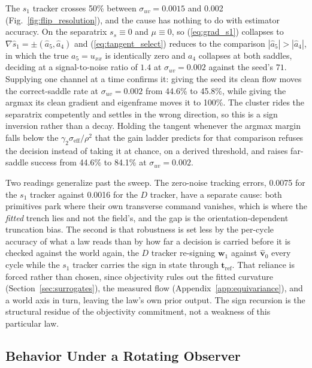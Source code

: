 \documentclass[lettersize,journal]{IEEEtran}
\begin{document}
The $s_1$ tracker crosses 50\% between $\sigma_{uv} = 0.0015$ and 0.002
(Fig.~\ref{fig:flip_resolution}), and the cause has nothing to do with
estimator accuracy. On the separatrix $s_s \equiv 0$ and $\mu \equiv 0$,
so (\ref{eq:grad_s1}) collapses to $\nabla\hat{s}_1 = \pm(\hat{a}_5,
\hat{a}_4)$ and (\ref{eq:tangent_select}) reduces to the comparison
$|\hat{a}_5| > |\hat{a}_4|$, in which the true $a_5 = u_{xx}$ is
identically zero and $a_4$ collapses at both saddles, deciding at a
signal-to-noise ratio of $1.4$ at $\sigma_{uv} = 0.002$ against the
seed's $71$. Supplying one channel at a time confirms it: giving the
seed its clean flow moves the correct-saddle rate at $\sigma_{uv} =
0.002$ from 44.6\% to 45.8\%, while giving the argmax its clean gradient
and eigenframe moves it to 100\%. The cluster rides the separatrix
competently and settles in the wrong direction, so this is a sign
inversion rather than a decay. Holding the tangent whenever the argmax
margin falls below the $\gamma_2\sigma_{\mathrm{eff}}/\rho^2$ that the
gain ladder predicts for that comparison refuses the decision instead of
taking it at chance, on a derived threshold, and raises far-saddle
success from 44.6\% to 84.1\% at $\sigma_{uv} = 0.002$.

Two readings generalize past the sweep. The zero-noise tracking errors,
0.0075 for the $s_1$ tracker against 0.0016 for the $D$ tracker, have a
separate cause: both primitives park where their own transverse command
vanishes, which is where the \emph{fitted} trench lies and not the
field's, and the gap is the orientation-dependent truncation bias. The second is
that robustness is set less
by the per-cycle accuracy of what a law reads than by how far a decision
is carried before it is checked against the world again, the $D$ tracker
re-signing $\mathbf{w}_1$ against $\hat{\mathbf{v}}_0$ every cycle while
the $s_1$ tracker carries the sign in state through
$\mathbf{t}_{\text{ref}}$. That reliance is forced rather than chosen,
since objectivity rules out the fitted curvature
(Section~\ref{sec:surrogates}), the measured flow
(Appendix~\ref{app:equivariance}), and a world axis in turn, leaving the
law's own prior output. The sign recursion is the structural residue of
the objectivity commitment, not a weakness of this particular
law.

\subsection{Behavior Under a Rotating Observer}
\end{document}

